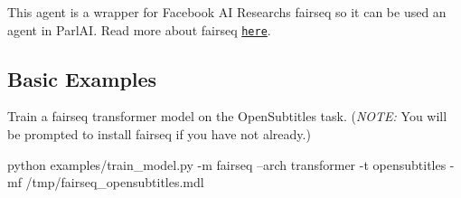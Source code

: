 This agent is a wrapper for Facebook AI Research\textquotesingle{}s fairseq so it can be used an agent in Parl\+AI. Read more about fairseq \href{https://github.com/facebookresearch/fairseq}{\tt here}.

\subsection*{Basic Examples}

Train a fairseq transformer model on the Open\+Subtitles task. ({\itshape N\+O\+TE\+:} You will be prompted to install fairseq if you have not already.) 
\begin{DoxyCode}
python examples/train\_model.py -m fairseq --arch transformer -t opensubtitles -mf
       /tmp/fairseq\_opensubtitles.mdl
\end{DoxyCode}
 